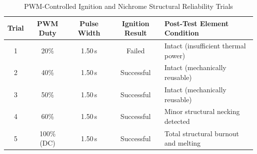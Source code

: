 \begin{table}[!htbp]
  \centering
  \caption{PWM-Controlled Ignition and Nichrome Structural Reliability Trials}
  \label{tab:bench_igniter_profiles}
  \small
  \renewcommand{\arraystretch}{1.2}
  \begin{tabular}{@{}c|c|c|c|l@{}}
    \toprule
    \rowcolor{gray!22}\textbf{Trial} & \textbf{PWM Duty} & \textbf{Pulse Width} & \textbf{Ignition Result} & \textbf{Post-Test Element Condition} \\ \midrule
    1 & 20\% & 1.50\,s & Failed & Intact (insufficient thermal power) \\ \hline
    2 & 40\% & 1.50\,s & Successful & Intact (mechanically reusable) \\ \hline
    3 & 50\% & 1.50\,s & Successful & Intact (mechanically reusable) \\ \hline
    4 & 60\% & 1.50\,s & Successful & Minor structural necking detected \\ \hline
    5 & 100\% (DC) & 1.50\,s & Successful & Total structural burnout and melting \\ \bottomrule
  \end{tabular}
\end{table}
